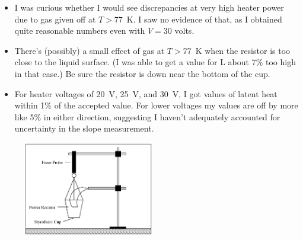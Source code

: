 {\begin{itemize}[nosep]
\item I was curious whether I would see discrepancies at very high heater power due to gas given off at $T > 77$~K.  I saw no evidence of that, as I obtained quite reasonable numbers even with $V=30$ volts.

\item There's (possibly) a small effect of gas at $T>77$~K when the resistor is too close to the liquid surface.  (I was able to get a value for L about 7\% too high in that case.)  Be sure the resistor is down near the bottom of the cup.

\item For heater voltages of 20~V, 25~V, and 30~V, I got values of latent heat within 1\% of the accepted value.  For lower voltages my values are off by more like 5\% in either direction, suggesting I haven't adequately accounted for uncertainty in the slope measurement.
\end{itemize}
}

\makelabheader %

\bigskip

\begin{figure}
    \vspace{0.1in}
    \includegraphics[width=0.51\textwidth]{latent_heat_of_vaporization_of_nitrogen/heat_vap_nit_fig_1.eps}
\end{figure}

\bigskip

